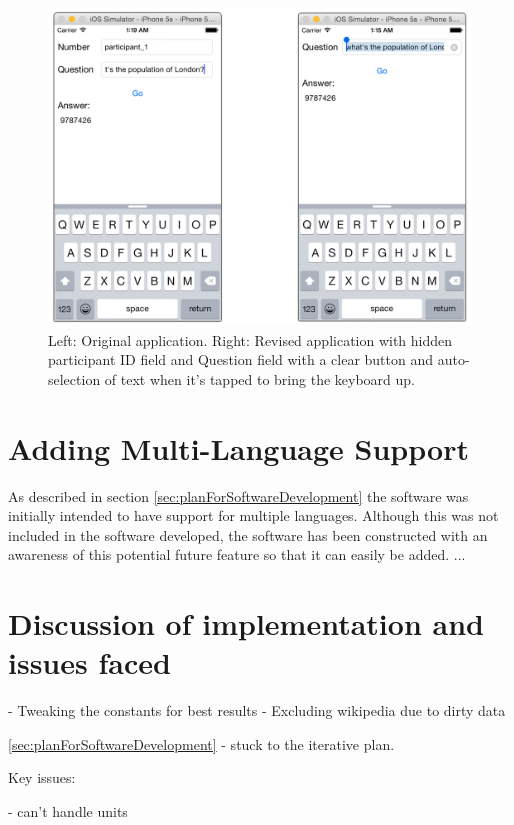 \documentclass[authoryearcitations]{UoYCSproject}
\begin{document}
\begin{figure}[htb]
    \centering
    \includegraphics[width=\linewidth]{population}
    \caption{Left: Original application. Right: Revised application with hidden participant ID field and Question field with a clear button and auto-selection of text when it's tapped to bring the keyboard up.}
    \label{fig:experimentClientPopulation}
\end{figure}

\section{Adding Multi-Language Support}
\label{sec:addingMultilanguageSupport}
As described in section \ref{sec:planForSoftwareDevelopment} the software was initially intended to have support for multiple languages. Although this was not included in the software developed, the software has been constructed with an awareness of this potential future feature so that it can easily be added.
...%

\section{Discussion of implementation and issues faced}
 - Tweaking the constants for best results
 - Excluding wikipedia due to dirty data
 
 \ref{sec:planForSoftwareDevelopment} - stuck to the iterative plan.
 
Key issues:

 - can't handle units
 
\end{document}
